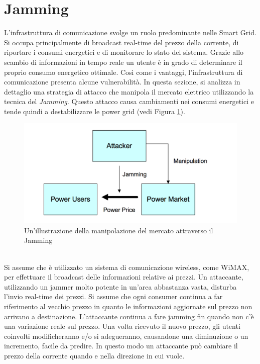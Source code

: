 \section{Jamming}
L'infrastruttura di comunicazione svolge un ruolo predominante nelle Smart Grid. Si occupa principalmente di broadcast real-time del prezzo della corrente, di riportare i consumi energetici e di monitorare lo stato del sistema. Grazie allo scambio di informazioni in tempo reale un utente è in grado di determinare il proprio consumo energetico ottimale.\newline
Così come i vantaggi, l'infrastruttura di comunicazione presenta alcune vulnerabilità. In questa sezione, si analizza in dettaglio una strategia di attacco che manipola il mercato elettrico utilizzando la tecnica del \emph{Jamming}. Questo attacco causa cambiamenti nei consumi energetici e tende quindi a destabilizzare le power grid (vedi Figura \ref{fig:jm}).
\begin{figure}[h]
	\centering
	\includegraphics[scale=0.320]{imgs/attack/jm.png}
	\caption{Un'illustrazione della manipolazione del mercato attraverso il Jamming} \label{fig:jm}
\end{figure}\\
Si assume che è utilizzato un sistema di comunicazione wireless, come WiMAX, per effettuare il broadcast delle informazioni relative ai prezzi. Un attaccante, utilizzando un jammer molto potente in un'area abbastanza vasta, disturba l'invio real-time dei prezzi\cite{jamming}. Si assume che ogni consumer continua a far riferimento al vecchio prezzo in quanto le informazioni aggiornate sul prezzo non arrivano a destinazione. L'attaccante continua a fare jamming fin quando non c'è una variazione reale sul prezzo. Una volta ricevuto il nuovo prezzo, gli utenti coinvolti modificheranno e/o si adegueranno, causandone una diminuzione o un incremento, facile da predire. In questo modo un attaccante può cambiare il prezzo della corrente quando e nella direzione in cui vuole.
